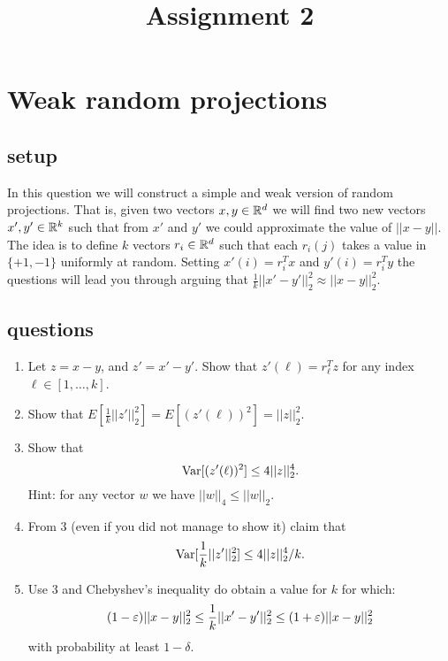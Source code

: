 \documentclass{article}
\title{Assignment 2} %
\begin{document}
\date{\nonumber}
\maketitle

\section{Weak random projections}
\subsection*{setup}
In this question we will construct a simple and weak version of
random projections. That is, given two vectors $x,y \in{\mathbb{R}}^{d}$ we
will find two new vectors $x',y'\in {\mathbb{R}}^{k}$ such that from $x'$ and
$y'$ we could approximate the value of $||x-y||$. The idea is to
define $k$ vectors $r_i \in {\mathbb{R}}^{d}$ such that each $r_i(j)$ takes a
value in $\{+1,-1\}$ uniformly at random. Setting $x'(i) =
r_{i}^{T}x$ and $y'(i) = r_{i}^{T}y$ the questions will lead you through arguing that
$\frac{1}{k}||x' -y'||_{2}^{2} \approx ||x-y||_{2}^{2}$.

\subsection*{questions}
\begin{enumerate}
\item Let $z = x-y$, and $z' = x' - y'$. Show that $z'(\ell) =
r_{\ell}^{T}z$ for any index $\ell \in [1,\ldots,k]$.

\item Show that $E[\frac{1}{k}||z'||_{2}^{2}] = E[(z'(\ell))^2] = ||z||_{2}^{2}$.
\item Show that
\[
{\operatorname{Var}}[(z'(\ell))^2] \le 4||z||_{2}^{4}.
\]
Hint: for any vector $w$ we have $||w||_4 \le ||w||_2$.
\item From 3 (even if you did not manage to show it) claim that
\[
{\operatorname{Var}}[\frac{1}{k}||z'||_{2}^{2}] \le 4||z||_{2}^{4}/k.
\]
\item Use 3 and Chebyshev's inequality do obtain a value for $k$
for which:
\[
(1-\varepsilon)||x-y||_{2}^{2} \le \frac{1}{k}||x' -y'||_{2}^{2} \le
(1+\varepsilon)||x-y||_{2}^{2}
\]
with probability at least $1-\delta$.
\end{enumerate}
\end{document}
